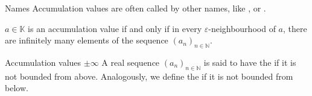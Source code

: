 \begin{Attention}{Names}
Accumulation values are often called by other names, like ,
 or .
\end{Attention}

\begin{Proposition}{}
 $a\in \mathbb{K}$ is an accumulation value if and only if in every $\varepsilon$-neighbourhood of $a$, there are infinitely many elements of the sequence $(a_{n})_{n\in\mathbb{N}}$.
\end{Proposition}

\begin{Definition}{Accumulation values $\pm\infty$}\label{accinf}
A real sequence $(a_n)_{n\in\mathbb{N}}$ is said to have the  if it is not bounded from above.
Analogously, we define the  if it is not bounded from below.
\end{Definition}
